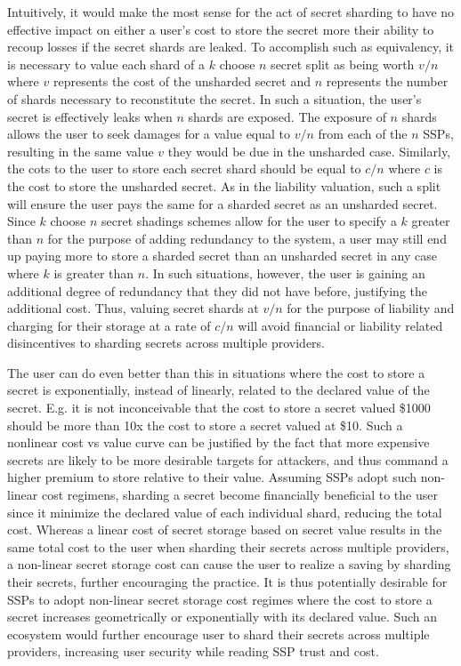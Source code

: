Intuitively, it would make the most sense for the act of secret
sharding to have no effective impact on either a user's cost to store
the secret more their ability to recoup losses if the secret shards
are leaked. To accomplish such as equivalency, it is necessary to
value each shard of a $k$ choose $n$ secret split as being worth $v/n$
where $v$ represents the cost of the unsharded secret and $n$
represents the number of shards necessary to reconstitute the
secret. In such a situation, the user's secret is effectively leaks
when $n$ shards are exposed. The exposure of $n$ shards allows the
user to seek damages for a value equal to $v/n$ from each of the $n$
SSPs, resulting in the same value $v$ they would be due in the
unsharded case. Similarly, the cots to the user to store each secret
shard should be equal to $c/n$ where $c$ is the cost to store the
unsharded secret. As in the liability valuation, such a split will
ensure the user pays the same for a sharded secret as an unsharded
secret. Since $k$ choose $n$ secret shadings schemes allow for the
user to specify a $k$ greater than $n$ for the purpose of adding
redundancy to the system, a user may still end up paying more to store
a sharded secret than an unsharded secret in any case where $k$ is
greater than $n$. In such situations, however, the user is gaining an
additional degree of redundancy that they did not have before,
justifying the additional cost. Thus, valuing secret shards at $v/n$
for the purpose of liability and charging for their storage at a rate
of $c/n$ will avoid financial or liability related disincentives to
sharding secrets across multiple providers.

The user can do even better than this in situations where the cost to
store a secret is exponentially, instead of linearly, related to the
declared value of the secret. E.g. it is not inconceivable that the
cost to store a secret valued \$1000 should be more than 10x the cost
to store a secret valued at \$10. Such a nonlinear cost vs value curve
can be justified by the fact that more expensive secrets are likely to
be more desirable targets for attackers, and thus command a higher
premium to store relative to their value. Assuming SSPs adopt such
non-linear cost regimens, sharding a secret become financially
beneficial to the user since it minimize the declared value of each
individual shard, reducing the total cost. Whereas a linear cost of
secret storage based on secret value results in the same total cost to
the user when sharding their secrets across multiple providers, a
non-linear secret storage cost can cause the user to realize a saving
by sharding their secrets, further encouraging the practice. It is
thus potentially desirable for SSPs to adopt non-linear secret storage
cost regimes where the cost to store a secret increases geometrically
or exponentially with its declared value. Such an ecosystem would
further encourage user to shard their secrets across multiple
providers, increasing user security while reading SSP trust and cost.

